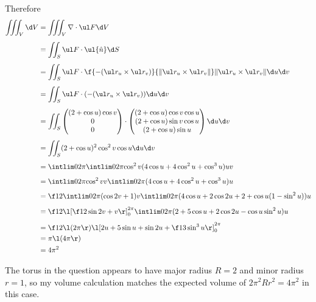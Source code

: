 \documentclass[a4paper]{article}
\begin{document}
Therefore \begin{align*}
\iiint_V \d V &= \iiint_V \nabla \cdot \ul F \d V\\[1ex]
&= \iint_S \ul F \cdot \ul{\hat n} \d S\\[1ex]
&= \iint_S \ul F \cdot \f{-(\ul r_u \times \ul r_v)}{\| \ul r_u \times \ul r_v \|} \| \ul r_u \times \ul r_v \| \d u \d v \\[1ex]
&= \iint_S \ul F \cdot (-(\ul r_u \times \ul r_v)) \d u \d v \\[1ex]
&= \iint_S \begin{pmatrix} (2 + \cos u) \cos v \\ 0 \\ 0 \end{pmatrix} \cdot \begin{pmatrix} (2 + \cos u) \cos v \cos u \\ (2 + \cos u) \sin v \cos u \\ (2 + \cos u) \sin u \end{pmatrix} \d u \d v \\[1ex]
&= \iint_S (2 + \cos u)^2 \cos^2 v \cos u \d u \d v \\[1ex]
&= \intlim 0{2\pi} {\intlim 0{2\pi} {\cos^2 v (4 \cos u + 4 \cos^2 u + \cos^3 u)} u} v\\[1ex]
&= \intlim 0{2\pi} {\cos^2 v} v \intlim 0{2\pi} {(4 \cos u + 4 \cos^2 u + \cos^3 u)} u\\[1ex]
&= \f12 \intlim 0{2\pi} {(\cos 2v + 1)} v \intlim 0{2\pi} {(4 \cos u + 2 \cos 2u + 2 + \cos u (1 - \sin^2 u))} u\\[1ex]
&= \f12 \l[ \f12 \sin 2v + v \r]_0^{2\pi} \intlim 0{2\pi} {(2 + 5 \cos u + 2 \cos 2u - \cos u \sin^2 u)} u\\[1ex]
&= \f12 \l( 2 \pi \r) \l[ 2u + 5 \sin u + \sin 2u + \f13 \sin^3 u \r]_0^{2\pi}\\
&= \pi \l( 4\pi \r)\\
&= 4 \pi^2
\end{align*}

The torus in the question appears to have major radius $R=2$ and minor radius $r=1$, so my volume calculation matches the expected volume of $2\pi^2 R r^2 = 4\pi^2$ in this case.

\end{document}
